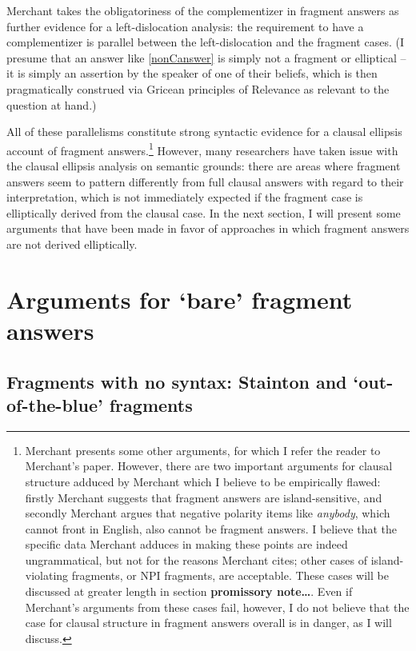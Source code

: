 \documentclass[doublespace]{umthesis}
\begin{document}
Merchant takes the obligatoriness of the complementizer in fragment answers as further evidence for a left-dislocation analysis: the requirement to have a complementizer is parallel between the left-dislocation and the fragment cases. (I presume that an answer like \ref{nonCanswer} is simply not a fragment or elliptical -- it is simply an assertion by the speaker of one of their beliefs, which is then pragmatically construed via Gricean principles of Relevance as relevant to the question at hand.)

All of these parallelisms constitute strong syntactic evidence for a clausal ellipsis account of fragment answers.\footnote{Merchant presents some other arguments, for which I refer the reader to Merchant's paper. However, there are two important arguments for clausal structure adduced by Merchant which I believe to be empirically flawed: firstly Merchant suggests that fragment answers are island-sensitive, and secondly Merchant argues that negative polarity items like {\it anybody}, which cannot front in English, also cannot be fragment answers. I believe that the specific data Merchant adduces in making these points are indeed ungrammatical, but not for the reasons Merchant cites; other cases of island-violating fragments, or NPI fragments, are acceptable. These cases will be discussed at greater length in section {\bf promissory note\ldots}.%
Even if Merchant's arguments from these cases fail, however, I do not believe that the case for clausal structure in fragment answers overall is in danger, as I will discuss.} However, many 
researchers have taken issue with the clausal ellipsis analysis on semantic grounds: there are areas where fragment answers seem to pattern differently from full clausal answers with regard to their interpretation, which is not immediately expected if the fragment case is elliptically derived from the clausal case. In the next section, I will present some arguments that have been made in favor of approaches in which fragment answers are not derived elliptically.

\section{Arguments for `bare' fragment answers}

\subsection{Fragments with no syntax: Stainton and `out-of-the-blue' fragments}
\end{document}
